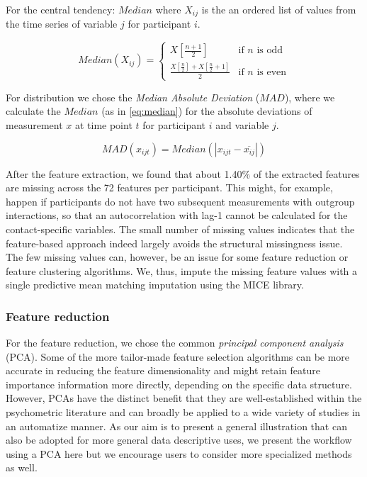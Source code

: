 For the central tendency: \(Median\) where \(X_{ij}\) is the an ordered
list of values from the time series of variable \(j\) for participant
\(i\).

\begin{equation} \label{eq:median}
  Median(X_{ij}) = 
    \begin{cases}
      X \left[ \frac{n+1}{2} \right] & \text{if $n$ is odd} \\
      \frac{X \left[ \frac{n}{2} \right] + X \left[ \frac{n}{2} +1 \right]}{2} & \text{if $n$ is even}
    \end{cases}
\end{equation}

For distribution we chose the \textit{Median Absolute Deviation}
(\(MAD\)), where we calculate the \(Median\) (as in \eqref{eq:median})
for the absolute deviations of measurement \(x\) at time point \(t\) for
participant \(i\) and variable \(j\).

\begin{equation} \label{eq:mad}
  MAD(x_{ijt}) = Median(| x_{ijt} - \overline{x_{ij}} |)
\end{equation}

After the feature extraction, we found that about 1.40\% of the
extracted features are missing across the 72 features per participant.
This might, for example, happen if participants do not have two
subsequent measurements with outgroup interactions, so that an
autocorrelation with lag-1 cannot be calculated for the contact-specific
variables. The small number of missing values indicates that the
feature-based approach indeed largely avoids the structural missingness
issue. The few missing values can, however, be an issue for some feature
reduction or feature clustering algorithms. We, thus, impute the missing
feature values with a single predictive mean matching imputation using
the MICE library.

\subsubsection{Feature reduction}

For the feature reduction, we chose the common
\textit{principal component analysis} (PCA). Some of the more
tailor-made feature selection algorithms can be more accurate in
reducing the feature dimensionality and might retain feature importance
information more directly, depending on the specific data structure.
However, PCAs have the distinct benefit that they are well-established
within the psychometric literature and can broadly be applied to a wide
variety of studies in an automatize manner. As our aim is to present a
general illustration that can also be adopted for more general data
descriptive uses, we present the workflow using a PCA here but we
encourage users to consider more specialized methods as well.

